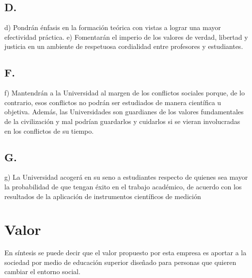 \documentclass{article}
\begin{document}
\subsection{D.}
d) Pondrán énfasis en la formación teórica con vistas a lograr una mayor efectividad práctica.
e) Fomentarán el imperio de los valores de verdad, libertad y justicia en un ambiente de respetuosa cordialidad entre profesores y estudiantes.

\subsection{F.}
f) Mantendrán a la Universidad al margen de los conflictos sociales porque, de lo contrario, esos conflictos no podrán ser estudiados de manera científica u objetiva. Además, las Universidades son guardianes de los valores fundamentales de la civilización y mal podrían guardarlos y cuidarlos si se vieran involucradas en los conflictos de su tiempo.

\subsection{G.}
g) La Universidad acogerá en su seno a estudiantes respecto de quienes sea mayor la probabilidad de que tengan éxito en el trabajo académico, de acuerdo con los resultados de la aplicación de instrumentos científicos de medición





\section{Valor}
En síntesis se puede decir que el valor propuesto por esta empresa es aportar a la sociedad por medio de educación superior diseñado para personas que quieren cambiar el entorno social.
\end{document}
